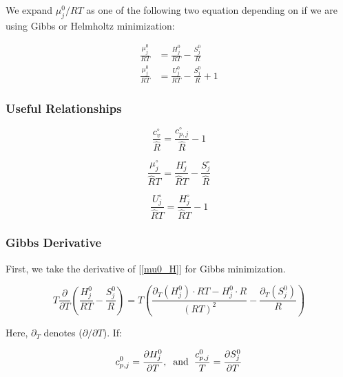 \documentclass[10pt]{article}
\begin{document}
\begin{flushleft}
We expand $\mu_j^0 /RT$ as one of the following two equation depending on if we are using Gibbs or Helmholtz minimization:

\begin{align}
    \frac{\mu_j^0}{RT} &= \frac{H_j^0}{RT} - \frac{S_j^0}{R} 
    \label{mu0_H}
    \\ \frac{\mu_j^0}{RT} &= \frac{U_j^0}{RT} - \frac{S_j^0}{R} + 1
    \label{mu0_U}
\end{align}

\subsubsection{Useful Relationships}

\begin{equation}
    \frac{c_v^\circ}{\hat{R}} = \frac{c_{p,j}^\circ}{\hat{R}} -1
\end{equation}

\begin{equation}
    \frac{\mu_j^\circ}{\hat{R}T} = \frac{H_j^\circ}{\hat{R}T} - \frac{S_j^\circ}{\hat{R}} 
\end{equation}

\begin{equation}
    \frac{U_j^\circ}{\hat{R}T} = \frac{H_j^\circ}{\hat{R}T} - 1
\end{equation}


\subsubsection{Gibbs Derivative}
\label{derivativesG}
First, we take the derivative of [\ref{mu0_H}] for Gibbs minimization.

\begin{equation}
    T \frac{\partial }{\partial T} \left( \frac{H_j^0}{RT} - \frac{S_j^0}{R} \right) = T \left( \frac{\partial_T(H_j^0) \cdot RT - H_j^0\cdot R}{(RT)^2} - \frac{\partial_T(S_j^0)}{R}\right)
     \label{dmu0_H}
\end{equation}

Here, $\partial_T$ denotes ($\partial/ \partial T$). If:

\begin{equation}
    c_{p,j}^0 = \frac{\partial H_j^0}{\partial T}, \hspace{2mm} \text{and} \hspace{2mm} \frac{c_{p,j}^0}{T} = \frac{\partial S_j^0}{\partial T} 
    \label{dSdT}
\end{equation}


\end{flushleft}
\end{document}
